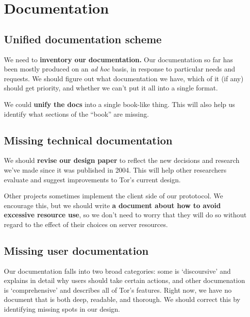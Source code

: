 \documentclass{article}
\begin{document}
\section{Documentation}

\subsection{Unified documentation scheme}

We need to {\bf inventory our documentation.}  Our documentation so far has
been mostly produced on an {\it ad hoc} basis, in response to particular
needs and requests.  We should figure out what documentation we have, which of
it (if any) should get priority, and whether we can't put it all into a
single format.

We could {\bf unify the docs} into a single book-like thing.  This will also
help us identify what sections of the ``book'' are missing.

\subsection{Missing technical documentation}

We should {\bf revise our design paper} to reflect the new decisions and
research we've made since it was published in 2004.  This will help other
researchers evaluate and suggest improvements to Tor's current design.

Other projects sometimes implement the client side of our prototocol.  We
encourage this, but we should write {\bf a document about how to avoid
excessive resource use}, so we don't need to worry that they will do so
without regard to the effect of their choices on server resources.

\subsection{Missing user documentation}

Our documentation falls into two broad categories: some is `discoursive' and
explains in detail why users should take certain actions, and other
documenation is `comprehensive' and describes all of Tor's features.  Right
now, we have no document that is both deep, readable, and thorough.  We
should correct this by identifying missing spots in our design.

 
\end{document}
